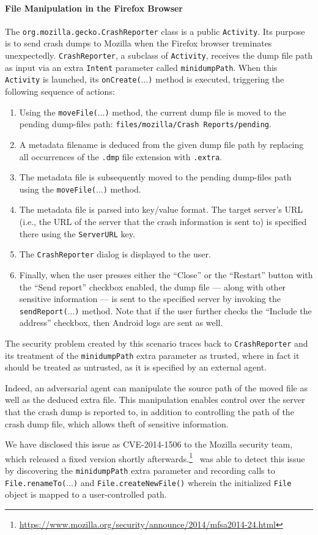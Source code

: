 \paragraph{File Manipulation in the Firefox Browser}\label{Se:FirefoxFileManipulation}

The {\tt org.mozilla.gecko.CrashReporter} class is a public {\tt Activity}. Its purpose is to send crash dumps to Mozilla when the Firefox browser treminates unexpectedly.
{\tt CrashReporter}, a subclass of {\tt Activity}, receives the dump file path as input via an extra {\tt Intent} parameter called {\tt minidumpPath}. When this {\tt Activity} is launched, its {\tt onCreate($\ldots$)} method is executed, triggering the following sequence of actions:
\begin{enumerate}
	\item Using the \texttt{moveFile($\ldots$)} method, the current dump file is moved to the pending dump-files path: \texttt{files/mozilla/Crash Reports/pending}.
	\item A metadata filename is deduced from the given dump file path by replacing all occurrences of the {\tt .dmp} file extension with  {\tt .extra}. 
	\item The metadata file is subsequently moved to the pending dump-files path using the \texttt{moveFile($\ldots$)} method.
	\item The metadata file is parsed into key/value format. The target server's URL (i.e., the URL of the server that the crash information is sent to) is specified there using the \texttt{ServerURL} key.
	\item The {\tt CrashReporter} dialog is displayed to the user.
	\item Finally, when the user presses either the ``Close'' or the ``Restart'' button with the ``Send report'' checkbox enabled, the dump file --- along with other sensitive information --- is sent to the specified server by invoking the {\tt sendReport($\ldots$)} method. Note that if the user further checks the ``Include the address'' checkbox, then Android logs are sent as well.
\end{enumerate}
The security problem created by this scenario traces back to {\tt CrashReporter} and its treatment of the {\tt minidumpPath} extra parameter as trusted, where in fact it should be treated as untrusted, as it is specified by an external agent.

Indeed, an adversarial agent can manipulate the source path of the moved file as well as the deduced extra file. 
This manipulation enables control over the server that the crash dump is reported to, in addition to controlling the path of the crash dump file, which allows theft of sensitive information.

We have disclosed this issue as CVE-2014-1506 to the Mozilla security team, which released a fixed version shortly afterwards.\footnote{\url{https://www.mozilla.org/security/announce/2014/mfsa2014-24.html}} 
	\Tool\ was able to detect this issue by discovering the {\tt minidumpPath} extra parameter and recording calls to {\tt File.renameTo($\ldots$)} and {\tt File.createNewFile()} wherein the initialized {\tt File} object is mapped to  a user-controlled path.